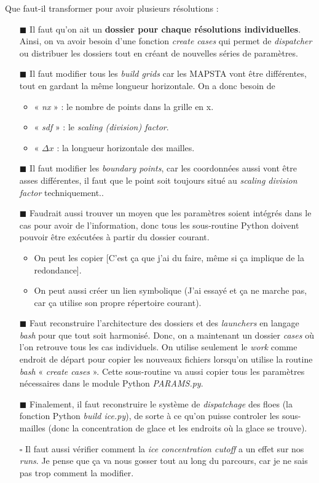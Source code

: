 \documentclass[10pt]{article}
\numberwithin{equation}{section}
\renewcommand{\boxtimes}{\blacksquare}
\begin{document}
Que faut-il transformer pour avoir plusieurs résolutions :
\begin{itemize}
\item[{$\boxtimes$}] Il faut qu'on ait un \textbf{dossier pour chaque résolutions individuelles}. Ainsi, on va avoir besoin d'une fonction \emph{create cases} qui permet de \emph{dispatcher} ou distribuer les dossiers tout en créant de nouvelles séries de paramètres.
\item[{$\boxtimes$}] Il faut modifier tous les \emph{build grids} car les MAPSTA vont être différentes, tout en gardant la même longueur horizontale. On a donc besoin de
\begin{itemize}
\item « \emph{nx} »  : le nombre de points dans la grille en x.
\item « \emph{sdf} » : le \emph{scaling (division) factor}.
\item « \(\Delta x\)  : la longueur horizontale des mailles.
\end{itemize}
\item[{$\boxtimes$}] Il faut modifier les \emph{boundary points}, car les coordonnées aussi vont être asses différentes, il faut que le point soit toujours situé au \emph{scaling division factor} techniquement..
\item[{$\boxtimes$}] Faudrait aussi trouver un moyen que les paramètres soient intégrés dans le cas pour avoir de l'information, donc tous les sous-routine Python doivent pouvoir être exécutées à partir du dossier courant.
\begin{itemize}
\item On peut les copier [C'est ça que j'ai du faire, même si ça implique de la redondance].
\item On peut aussi créer un lien symbolique (J'ai essayé et ça ne marche pas, car ça utilise son propre répertoire courant).
\end{itemize}
\item[{$\boxtimes$}] Faut reconstruire l'architecture des dossiers et des \emph{launchers} en langage \emph{bash} pour que tout soit harmonisé. Donc, on a maintenant un dossier \emph{cases} où l'on retrouve tous les cas individuels. On utilise seulement le \emph{work} comme endroit de départ pour copier les nouveaux fichiers lorsqu'on utilise la routine \emph{bash} « \emph{create cases} ». Cette sous-routine va aussi copier tous les paramètres nécessaires dans le module Python \emph{PARAMS.py}.
\item[{$\boxtimes$}] Finalement, il faut reconstruire le système de \emph{dispatchage} des floes (la fonction Python \emph{build ice.py}), de sorte à ce qu'on puisse controler les sous-mailles (donc la concentration de glace et les endroits où la glace se trouve).
\item[{$\square$}] Il faut aussi vérifier comment la \emph{ice concentration cutoff} a un effet sur nos \emph{runs}. Je pense que ça va nous gosser tout au long du parcours, car je ne sais pas trop comment la modifier.
\end{itemize}
\end{document}
